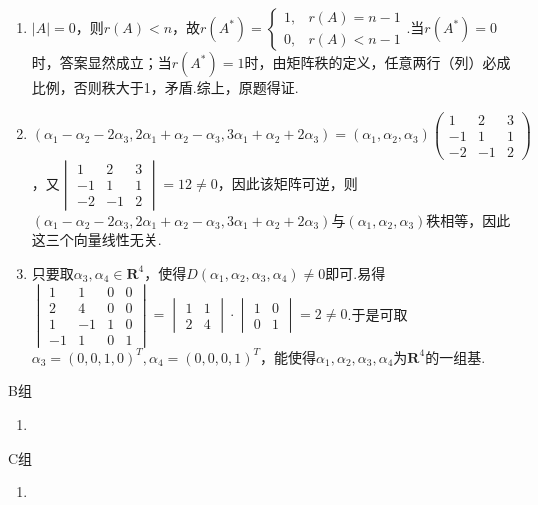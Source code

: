 \begin{enumerate}
    \item $|A|=0$，则$r(A)<n$，故$r(A^*)=\begin{cases}
        1,&r(A)=n-1\\
        0,&r(A)<n-1
    \end{cases}$.当$r(A^*)=0$时，答案显然成立；当$r(A^*)=1$时，由矩阵秩的定义，任意两行（列）必成比例，否则秩大于1，矛盾.综上，原题得证.
    \item $(\alpha_1-\alpha_2-2\alpha_3,2\alpha_1+\alpha_2-\alpha_3,3\alpha_1+\alpha_2+2\alpha_3)=(\alpha_1,\alpha_2,\alpha_3)\begin{pmatrix}
        1 & 2 & 3 \\ -1 & 1 & 1 \\ -2 & -1 & 2
    \end{pmatrix}$，又$\begin{vmatrix}
        1 & 2 & 3 \\ -1 & 1 & 1 \\ -2 & -1 & 2
    \end{vmatrix}=12\neq 0$，因此该矩阵可逆，则$(\alpha_1-\alpha_2-2\alpha_3,2\alpha_1+\alpha_2-\alpha_3,3\alpha_1+\alpha_2+2\alpha_3)$与$(\alpha_1,\alpha_2,\alpha_3)$秩相等，因此这三个向量线性无关.
    \item 只要取$\alpha_3,\alpha_4 \in \mathbf{R}^4$，使得$D(\alpha_1,\alpha_2,\alpha_3,\alpha_4) \neq 0$即可.易得$\begin{vmatrix}
        1 & 1 & 0 & 0 \\
        2 & 4 & 0 & 0 \\
        1 & -1 & 1 & 0 \\
        -1 & 1 & 0 & 1
    \end{vmatrix}=\begin{vmatrix}
        1 & 1 \\
        2 & 4
    \end{vmatrix} \cdot \begin{vmatrix}
        1 & 0 \\
        0 & 1
    \end{vmatrix}=2 \neq 0$.于是可取$\alpha_3=(0,0,1,0)^T,\alpha_4=(0,0,0,1)^T$，能使得${\alpha_1,\alpha_2,\alpha_3,\alpha_4}$为$\mathbf{R}^4$的一组基.
\end{enumerate}

\centerline{\heiti B组}
\begin{enumerate}
    \item
\end{enumerate}

\centerline{\heiti C组}
\begin{enumerate}
    \item
\end{enumerate}

\clearpage
